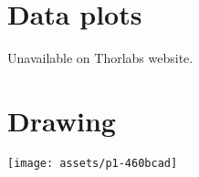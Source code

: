 \documentclass{article}
\begin{document}
\begin{multicols}{2}
\begin{tabular}{|l|l|}
\end{tabular}%

\section{Data plots}

Unavailable on Thorlabs website.

\end{multicols}
\section{Drawing}
\begin{center}
\texttt{[image: assets/p1-460bcad]}
\end{center}
\end{document}
